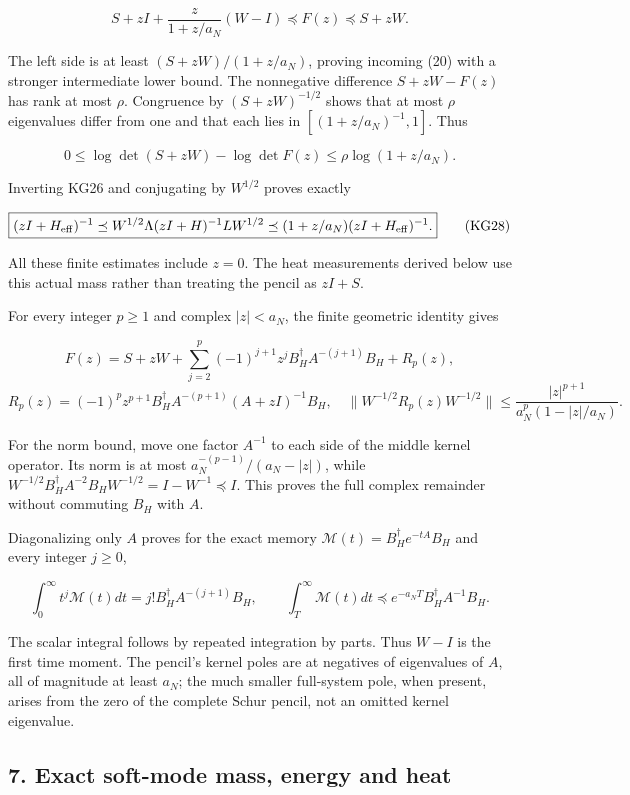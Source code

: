 \documentclass[11pt]{article}
\begin{document}
\[
\boxed{S+zI+\frac{z}{1+z/a_N}(W-I)
\preceq F(z)\preceq S+zW.}
\tag{KG26}
\]

The left side is at least \((S+zW)/(1+z/a_N)\), proving incoming (20) with a stronger intermediate lower bound. The nonnegative difference \(S+zW-F(z)\) has rank at most \(\rho\). Congruence by \((S+zW)^{-1/2}\) shows that at most \(\rho\) eigenvalues differ from one and that each lies in \([(1+z/a_N)^{-1},1]\). Thus

\[
\boxed{0\le\log\det(S+zW)-\log\det F(z)
\le\rho\log(1+z/a_N).}
\tag{KG27}
\]

Inverting KG26 and conjugating by \(W^{1/2}\) proves exactly

\[
\boxed{(zI+H_{\rm eff})^{-1}
\preceq W^{1/2}\Lambda(zI+H)^{-1}LW^{1/2}
\preceq(1+z/a_N)(zI+H_{\rm eff})^{-1}.}
\tag{KG28}
\]

All these finite estimates include \(z=0\). The heat measurements derived below use this actual mass rather than treating the pencil as \(zI+S\).

For every integer \(p\ge1\) and complex \(|z|<a_N\), the finite geometric identity gives

\[
F(z)=S+zW+\sum_{j=2}^p(-1)^{j+1}z^jB_H^\dagger A^{-(j+1)}B_H+R_p(z),
\] \[
R_p(z)=(-1)^pz^{p+1}B_H^\dagger A^{-(p+1)}(A+zI)^{-1}B_H,
\quad
\boxed{\|W^{-1/2}R_p(z)W^{-1/2}\|
\le\frac{|z|^{p+1}}{a_N^p(1-|z|/a_N)}.}
\tag{KG29}
\]

For the norm bound, move one factor \(A^{-1}\) to each side of the middle kernel operator. Its norm is at most \(a_N^{-(p-1)}/(a_N-|z|)\), while \(W^{-1/2}B_H^\dagger A^{-2}B_HW^{-1/2}=I-W^{-1}\preceq I\). This proves the full complex remainder without commuting \(B_H\) with \(A\).

Diagonalizing only \(A\) proves for the exact memory \(\mathcal M(t)=B_H^\dagger e^{-tA}B_H\) and every integer \(j\ge0\),

\[
\boxed{\int_0^\infty t^j\mathcal M(t)dt=j!B_H^\dagger A^{-(j+1)}B_H,\qquad
\int_T^\infty\mathcal M(t)dt\preceq e^{-a_NT}B_H^\dagger A^{-1}B_H.}
\tag{KG30}
\]

The scalar integral follows by repeated integration by parts. Thus \(W-I\) is the first time moment. The pencil's kernel poles are at negatives of eigenvalues of \(A\), all of magnitude at least \(a_N\); the much smaller full-system pole, when present, arises from the zero of the complete Schur pencil, not an omitted kernel eigenvalue.

\subsection{7. Exact soft-mode mass, energy and heat}\label{exact-soft-mode-mass-energy-and-heat}
\end{document}
